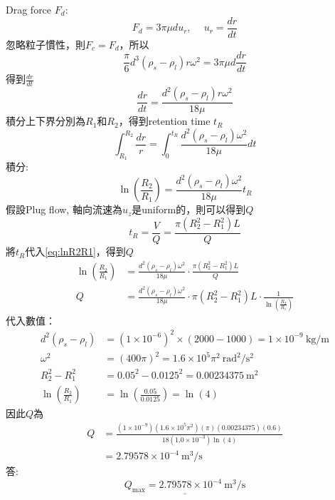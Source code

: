 ﻿\documentclass[12pt,a4paper]{article}
\begin{document}
\begin{problems}
\begin{equation}
\end{equation}
Drag force $F_d$:
\begin{equation}
  F_d = 3\pi \mu d u_r,~\quad u_r = \frac{dr}{dt}
\end{equation}
忽略粒子慣性，則$F_c = F_d$，所以
\begin{equation}
  \frac{\pi}{6} d^3 (\rho_s - \rho_l)  r\omega^2 = 3\pi \mu d \frac{dr}{dt}
\end{equation}
得到$\frac{dr}{dt}$
\begin{equation}
  \frac{dr}{dt} = \frac{d^2 (\rho_s - \rho_l) r\omega^2}{18 \mu}
\end{equation}
積分上下界分別為$R_1$和$R_2$，得到retention time $t_R$
\begin{equation}
  \int_{R_1}^{R_2} \frac{dr}{r} = \int_0^{t_R} \frac{d^2 (\rho_s - \rho_l) \omega^2}{18 \mu} dt
\end{equation}
積分:
\begin{equation}
  \ln \left(\frac{R_2}{R_1}\right) = \frac{d^2 (\rho_s - \rho_l) \omega^2}{18 \mu} t_R \label{eq:lnR2R1}
\end{equation}
假設Plug flow, 軸向流速為$u_z$是uniform的，則可以得到$Q$
\begin{equation}
t_R = \frac{V}{Q} = \frac{\pi (R_2^2 - R_1^2) L}{Q}
\end{equation}
將$t_R$代入\eqref{eq:lnR2R1}，得到$Q$
\begin{align}
  \ln \left(\frac{R_2}{R_1}\right) &= \frac{d^2 (\rho_s - \rho_l) \omega^2}{18 \mu}\cdot \frac{\pi (R_2^2 - R_1^2) L}{Q}\\
  Q &= \frac{d^2(\rho_s - \rho_l) \omega^2}{18 \mu}\cdot \pi (R_2^2 - R_1^2) L \cdot \frac{1}{\ln\left(\frac{R_2}{R_1}\right)}
\end{align}
代入數值：
\begin{align}
  d^2(\rho_s - \rho_l) &= (1\times 10^{-6})^2 \times (2000 - 1000) = 1 \times 10^{-9}~\text{kg/m} \\
  \omega^2 &= (400\pi)^2 = 1.6 \times 10^5 \pi^2~\text{rad}^2/\text{s}^2 \\
  R_2^2 - R_1^2 &= 0.05^2 - 0.0125^2 = 0.00234375~\text{m}^2 \\
  \ln\left(\frac{R_2}{R_1}\right) &= \ln\left(\frac{0.05}{0.0125}\right) = \ln(4)
\end{align}
因此$Q$為
\begin{align}
  Q &= \frac{(1 \times 10^{-9})(1.6 \times 10^5 \pi^2)(\pi)(0.00234375)(0.6)}{18 (1.0 \times 10^{-3}) \ln(4)}\nonumber\\
  & =  2.79578 \times 10^{-4}~\text{m}^3/\text{s} 
\end{align}
答:
\begin{equation}
  \underline{Q_{\max} = 2.79578 \times 10^{-4}~\text{m}^3/\text{s}}
\end{equation}
\end{problems}
\end{document}
